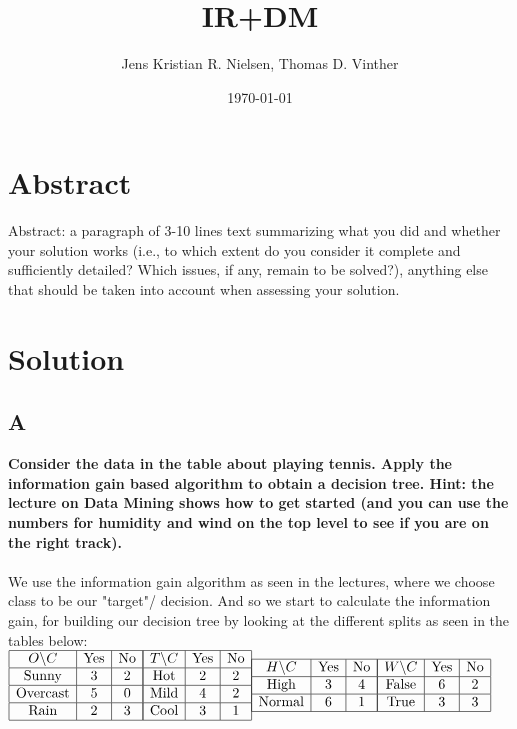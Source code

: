 \documentclass{article}
\title{IR+DM}
\author{Jens Kristian R. Nielsen, Thomas D. Vinther}
\date{\today}
\theoremstyle{remark}
\begin{document}
\maketitle

\section{Abstract}
Abstract: a paragraph of 3-10 lines text summarizing what you did and whether your solution works (i.e., to which extent do you consider it complete and sufficiently detailed? Which issues, if any, remain to be solved?), anything else that should be taken into account when assessing your solution.
\section{Solution}
\subsection{A}
\textbf{Consider the data in the table about playing tennis. Apply the information gain based algorithm to obtain a decision tree. Hint: the lecture on Data Mining shows how to get started (and you can use the numbers for humidity and wind on the top level to see if you are on the right track).}\\\\

We use the information gain algorithm as seen in the lectures, where we choose class to be our "target"/ decision.  And so we start to calculate the information gain, for building our decision tree by looking at the different splits as seen in the tables below: 
\\$\begin{array}{|c|c|c|} \hline
    O\backslash C & \text{Yes} & \text{No}\\\hline
    \text{Sunny} & 3 & 2\\\hline
    \text{Overcast} & 5 & 0\\\hline
    \text{Rain} & 2 & 3\\\hline
\end{array}
\begin{array}{|c|c|c|} \hline
    T\backslash C & \text{Yes} & \text{No}\\ \hline
    \text{Hot} & 2 & 2\\ \hline
    \text{Mild} & 4 & 2\\\hline
    \text{Cool} & 3 & 1\\\hline
\end{array}  
\begin{array}{|c|c|c|}\hline
    H\backslash C & \text{Yes} & \text{No}\\\hline
    \text{High} & 3 & 4\\\hline
    \text{Normal} & 6 & 1\\\hline
\end{array}
\begin{array}{|c|c|c|}\hline
    W\backslash C & \text{Yes} & \text{No}\\\hline
    \text{False} & 6 & 2\\\hline
    \text{True} & 3 & 3 \\\hline
\end{array}
$
\end{document}
